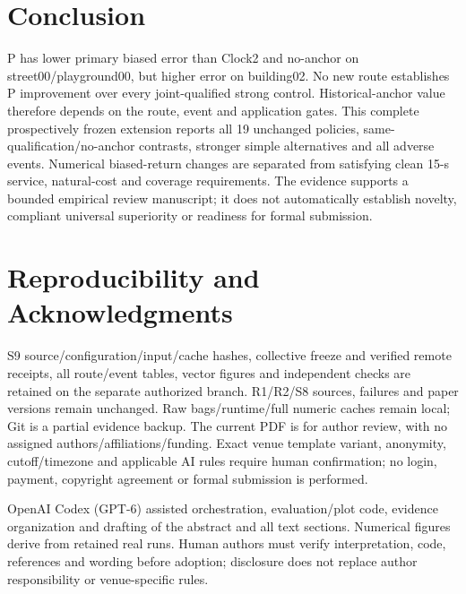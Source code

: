 \documentclass[conference]{IEEEtran}
\begin{document}
\section{Conclusion}
P has lower primary biased error than Clock2 and no-anchor on street00/playground00, but higher error on building02. No new route establishes P improvement over every joint-qualified strong control. Historical-anchor value therefore depends on the route, event and application gates. This complete prospectively frozen extension reports all 19 unchanged policies, same-qualification/no-anchor contrasts, stronger simple alternatives and all adverse events. Numerical biased-return changes are separated from satisfying clean 15-s service, natural-cost and coverage requirements. The evidence supports a bounded empirical review manuscript; it does not automatically establish novelty, compliant universal superiority or readiness for formal submission.

\section*{Reproducibility and Acknowledgments}
S9 source/configuration/input/cache hashes, collective freeze and verified remote receipts, all route/event tables, vector figures and independent checks are retained on the separate authorized branch. R1/R2/S8 sources, failures and paper versions remain unchanged. Raw bags/runtime/full numeric caches remain local; Git is a partial evidence backup. The current PDF is for author review, with no assigned authors/affiliations/funding. Exact venue template variant, anonymity, cutoff/timezone and applicable AI rules require human confirmation; no login, payment, copyright agreement or formal submission is performed.

OpenAI Codex (GPT-6) assisted orchestration, evaluation/plot code, evidence organization and drafting of the abstract and all text sections. Numerical figures derive from retained real runs. Human authors must verify interpretation, code, references and wording before adoption; disclosure does not replace author responsibility or venue-specific rules.

\end{document}

